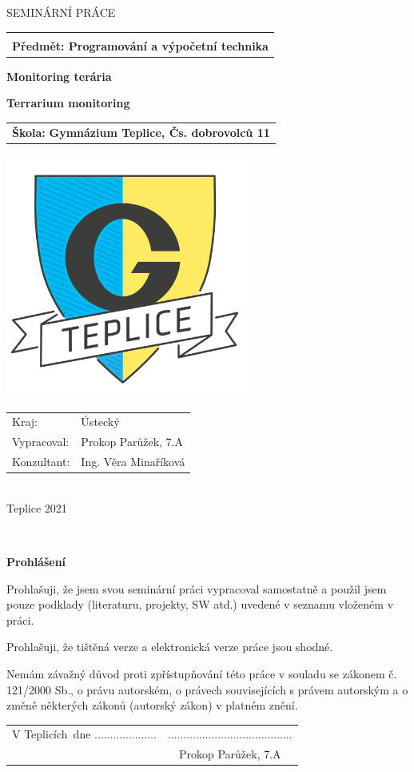 \documentclass[a4paper,twoside,12pt]{book}
\newcommand{\tb}{\textbf} %
\newcommand{\cvut}{Gymnázium Teplice, Čs. dobrovolců 11}
\newcommand{\ksi}{}
\newcommand{\obor}{Programování a výpočetní technika} %
\newcommand{\druh}{Seminární práce} %
\newcommand{\woman}{} %
\newcommand{\logoCVUT}{\includegraphics[height=8cm]{gympl}}  %
\newcommand{\nazevcz}{Monitoring terária}	%
\newcommand{\nazeven}{Terrarium monitoring}	%
\newcommand{\autor}{Prokop Parůžek, 7.A}   %
\newcommand{\vedouci}{Ing. Věra Minaříková} %
\newcommand{\kde}{Teplicích} %
\newcommand{\prohlaseni}{Prohlašuji, že jsem svou seminární práci vypracoval\woman{} samostatně a použil\woman{} jsem pouze podklady (literaturu, projekty, SW atd.) uvedené v seznamu vloženém v práci. 

Prohlašuji, že tištěná verze a elektronická verze práce jsou shodné. 

Nemám závažný důvod proti zpřístupňování této práce v souladu se zákonem č. 121/2000 Sb., o právu autorském, o právech souvisejících s právem autorským a o změně některých zákonů (autorský zákon) v platném znění. } %
\begin{document}
\thispagestyle{empty}

\begin{center}
   {\Large \MakeUppercase{\druh}}
	\vspace{5mm}

	\begin{tabular}{c}
		\tb{\ksi} \\[3pt]   \tb{Předmět: \obor}\\
	\end{tabular}

	\vspace{10mm}
   {\huge \tb{\nazevcz}\par}
   \vspace{5mm}   {\huge \tb{\nazeven}\par}
   
   \vspace{10mm}
	 \begin{tabular}{c}
			 \LARGE{\tb{Škola:} \tb{\cvut}}
	\end{tabular}

   \vspace{10mm} \logoCVUT \vspace{15mm} 

   \vfill
   {\large
	\begin{tabular}{ll}
	Kraj: & Ústecký\\
	Vypracoval: & \autor\\
	Konzultant: & \vedouci\\
	\end{tabular}
	 }\\
\vspace{1cm}
\LARGE{Teplice 2021}
\end{center}

\clearpage{\pagestyle{empty}\cleardoublepage} %

\newpage %
\thispagestyle{empty}  %

~ %
\vfill %

\tb{Prohlášení} %

\vspace{1em} %
\prohlaseni

\vspace{2em}  %
\hspace{-0.5em}\begin{tabularx}{\textwidth}{X c}  %
V \kde\ dne .................... &........................................ \\	%
	& \autor
\end{tabularx}	%
\end{document}
